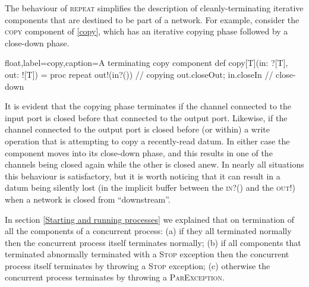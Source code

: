 \documentclass[12pt]{IOS-Book-Article-CPA-2017}
\begin{document}
The behaviour of \textsc{repeat} simplifies the description of cleanly-terminating iterative components
that are destined to be part of a network. For example, consider
the \textsc{copy} component of \Listing \ref{copy}, which has an iterative 
copying phase followed by a close-down phase.
\begin{code+}[...]{float,label=copy,caption={A terminating copy component}}
    def copy[T](in: ?[T], out: ![T]) = 
    proc {
      repeat { out!(in?()) }    // copying
      out.closeOut; in.closeIn  // close-down
    }
\end{code+}
It is evident that the copying phase terminates if the channel
connected to the input port is closed before that connected to the
output port. Likewise, if the channel connected to the output port
is closed before (or within) a write operation that is attempting
to copy a recently-read datum. In either case the component moves
into its close-down phase, and this results in one of the 
channels being closed again while the other is closed anew.
In nearly all  situations this behaviour is satisfactory, but it is
worth noticing that it can result in a datum being silently lost (in the implicit buffer between 
the \textsc{in?()} and the \textsc{out!}) when a
network is closed from ``downstream''.

In section {\ref{Starting and running processes}} we explained that
on termination of all the components of a concurrent process: 
(a) if they all terminated normally then the concurrent process 
itself terminates normally; (b) if all components that terminated abnormally
terminated with a \textsc{Stop} exception then the concurrent process 
itself terminates by throwing a \textsc{Stop} exception; (c) otherwise the concurrent process terminates 
by throwing a \textsc{ParException}.
\end{document}
